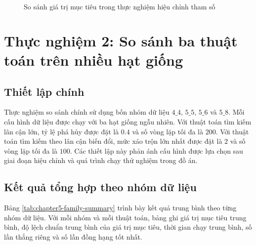\begin{figure}[H]
\centering
{}
\caption{So sánh giá trị mục tiêu trong thực nghiệm hiệu chỉnh tham số}
\label{fig:chapter5-gridsearch-bars}
\end{figure}

\section{Thực nghiệm 2: So sánh ba thuật toán trên nhiều hạt giống}

\subsection{Thiết lập chính}

Thực nghiệm so sánh chính sử dụng bốn nhóm dữ liệu $4\_4$, $5\_5$, $5\_6$ và $5\_8$. Mỗi cấu hình dữ liệu được chạy với ba hạt giống ngẫu nhiên. Với thuật toán tìm kiếm lân cận lớn, tỷ lệ phá hủy được đặt là $0.4$ và số vòng lặp tối đa là $200$. Với thuật toán tìm kiếm theo lân cận biến đổi, mức xáo trộn lớn nhất được đặt là $2$ và số vòng lặp tối đa là $100$. Các thiết lập này phản ánh cấu hình được lựa chọn sau giai đoạn hiệu chỉnh và quá trình chạy thử nghiệm trong đồ án.

\subsection{Kết quả tổng hợp theo nhóm dữ liệu}

Bảng \ref{tab:chapter5-family-summary} trình bày kết quả trung bình theo từng nhóm dữ liệu. Với mỗi nhóm và mỗi thuật toán, bảng ghi giá trị mục tiêu trung bình, độ lệch chuẩn trung bình của giá trị mục tiêu, thời gian chạy trung bình, số lần thắng riêng và số lần đồng hạng tốt nhất.

